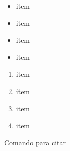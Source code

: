 \documentclass{article}
\begin{document}
\begin{multicols}{2}
\begin{itemize}
	\item item
	\item item
	\item item
	\item item
\end{itemize}

\begin{enumerate}
    \item item 
    \item item
    \item item
    \item item
\end{enumerate}
Comando para citar  \cite{gh1562}


\end{multicols}
\end{document}
